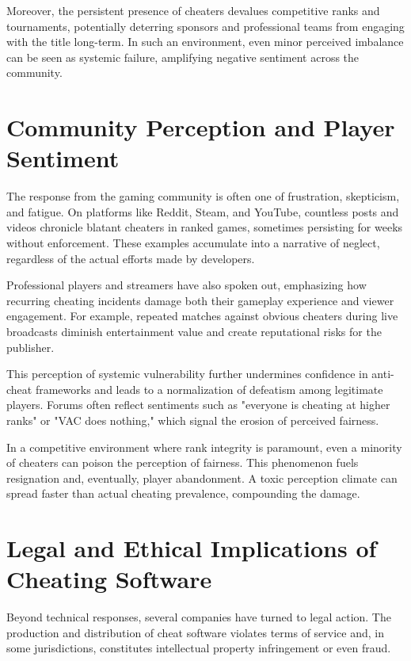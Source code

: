 Moreover, the persistent presence of cheaters devalues competitive ranks and tournaments, potentially deterring sponsors and professional teams from engaging with the title long-term. In such an environment, even minor perceived imbalance can be seen as systemic failure, amplifying negative sentiment across the community.

\section{Community Perception and Player Sentiment}

The response from the gaming community is often one of frustration, skepticism, and fatigue. On platforms like Reddit, Steam, and YouTube, countless posts and videos chronicle blatant cheaters in ranked games, sometimes persisting for weeks without enforcement. These examples accumulate into a narrative of neglect, regardless of the actual efforts made by developers.

Professional players and streamers have also spoken out, emphasizing how recurring cheating incidents damage both their gameplay experience and viewer engagement. For example, repeated matches against obvious cheaters during live broadcasts diminish entertainment value and create reputational risks for the publisher.

This perception of systemic vulnerability further undermines confidence in anti-cheat frameworks and leads to a normalization of defeatism among legitimate players. Forums often reflect sentiments such as "everyone is cheating at higher ranks" or "VAC does nothing," which signal the erosion of perceived fairness.

In a competitive environment where rank integrity is paramount, even a minority of cheaters can poison the perception of fairness. This phenomenon fuels resignation and, eventually, player abandonment. A toxic perception climate can spread faster than actual cheating prevalence, compounding the damage.

\section{Legal and Ethical Implications of Cheating Software}

Beyond technical responses, several companies have turned to legal action. The production and distribution of cheat software violates terms of service and, in some jurisdictions, constitutes intellectual property infringement or even fraud.

